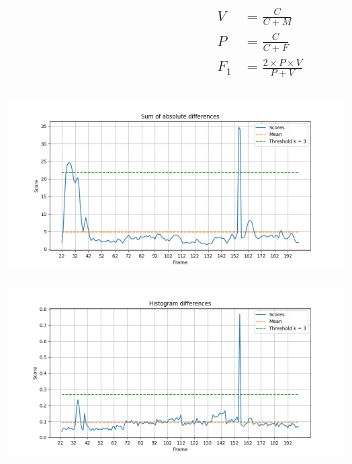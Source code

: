 \documentclass{article}
\begin{document}
\begin{equation}
\begin{split}
V &= \frac{C}{C + M} \\
P &= \frac{C}{C + F} \\
F_1 &= \frac{2 \times P \times V}{P + V} \\
\end{split}
\end{equation}

\vspace*{10pt}
\begin{minipage}{0.5\linewidth}
 \label{fig: clip_1_sad2}
\centering
\includegraphics[width=3.5in]{../output/clip_1_score_sad2.png}
\end{minipage}%
\begin{minipage}{0.5\linewidth}
 \label{fig: clip_1_hd}
\centering
\includegraphics[width=3.5in]{../output/clip_1_score_hd.png}
\end{minipage}
\end{document}
